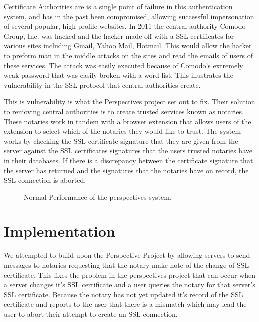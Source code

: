 \documentclass[preprint,review,12pt]{elsarticle}
\begin{document}
Certificate Authorities are is a single point of failure in this authentication
system, and has in the past been compromised, allowing successful impersonation
of several popular, high profile websites.  In 2011 the central authority
Comodo Group, Inc. was hacked and the hacker made off with a SSL certificates
for various sites including Gmail, Yahoo Mail, Hotmail.  \citep{comodohack}
This would allow the hacker to preform man in the middle attacks on the sites
and read the emails of users of these services. The attack was easily executed
because of Comodo's extremely weak password that was easily broken with a word
list. This illustrates the vulnerability in the SSL protocol that central
authorities create.

This is vulnerability is what the Perspectives project set out to fix. Their
solution to removing central authorities is to create trusted services known as
notaries. These notaries work in tandem with a browser extension that allows
users of the extension to select which of the notaries they would like to
trust. The system works by checking the SSL certificate signature that they are
given from the server against the SSL certificates signatures that the users
trusted notaries have in their databases. If there is a discrepancy between the
certificate signature that the server has returned and the signatures that the
notaries have on record, the SSL connection is aborted.

\begin{figure}[h]
\caption{Normal Performance of the perspectives system.}
\end{figure}

\section{Implementation}
\label{implementation}

We attempted to build upon the Perspective Project by allowing
servers to send messages to notaries requesting that the notary make note of
the change of SSL certificate. This fixes the problem in the perspectives
project that can occur when a server changes it's SSL certificate and a user
queries the notary for that server's SSL certificate. Because the notary has
not yet updated it's record of the SSL certificate and reports to the user that
there is a mismatch which may lead the user to abort their attempt to create an
SSL connection.
\end{document}
